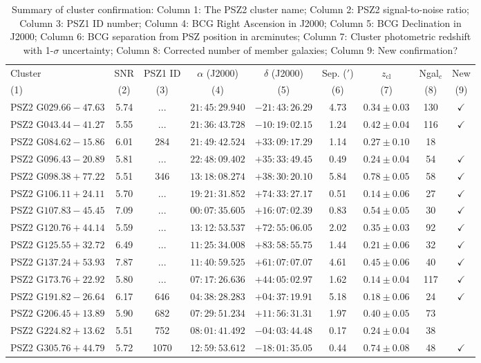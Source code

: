 \documentclass[apj, revtex4-1]{emulateapj}
\newcommand{\nd}{...}
\begin{document}
\begin{table*}
	\caption[Summary of Cluster Confirmation]{Summary of cluster confirmation: Column 1: The PSZ2 cluster name; Column 2: PSZ2 signal-to-noise ratio; Column 3: PSZ1 ID number; Column 4: BCG Right Ascension in J2000; Column 5: BCG Declination in J2000; Column 6: BCG separation from PSZ position in arcminutes; Column 7: Cluster photometric redshift with 1-$\sigma$ uncertainty; Column 8: Corrected number of member galaxies; Column 9: New confirmation? }
	\centering
	\begin{tabular}{lcccccccc}
	\hline
	Cluster & SNR & PSZ1 ID & $\alpha$ (J2000) & $\delta$ (J2000) & Sep. ($'$) & $z_\mathrm{cl}$ & Ngal$_c$ & New\\
	(1) & (2) & (3) & (4) & (5) & (6) & (7) & (8) & (9) \\
	\hline
	 PSZ2 G$029.66-47.63$ & 5.74 & \nd & $21:45:29.940$ & $-21:43:26.29$ & 4.73 & $0.34 \pm 0.03$ & 130 & $\checkmark$ \\
	 PSZ2 G$043.44-41.27$ & 5.55 & \nd & $21:36:43.728$ & $-10:19:02.15$ & 1.24 & $0.42 \pm 0.04$ & 116 & $\checkmark$ \\
	 PSZ2 G$084.62-15.86$ & 6.01 & 284 & $21:49:42.524$ & $+33:09:17.29$ & 1.14 & $0.27 \pm 0.10$ & 18 & \\
	 PSZ2 G$096.43-20.89$ & 5.81 & \nd & $22:48:09.402$ & $+35:33:49.45$ & 0.49 & $0.24 \pm 0.04$ & 54 & $\checkmark$ \\
	 PSZ2 G$098.38+77.22$ & 5.51 & 346 & $13:18:08.274$ & $+38:30:20.10$ & 5.84 & $0.78 \pm 0.05$ & 58 & $\checkmark$ \\
	 PSZ2 G$106.11+24.11$ & 5.70 & \nd & $19:21:31.852$ & $+74:33:27.17$ & 0.51 & $0.14 \pm 0.06$ & 27 & $\checkmark$ \\
	 PSZ2 G$107.83-45.45$ & 7.09 & \nd & $00:07:35.605$ & $+16:07:02.39$ & 0.83 & $0.54 \pm 0.05$ & 30 & $\checkmark$ \\
	 PSZ2 G$120.76+44.14$ & 5.59 & \nd & $13:12:53.537$ & $+72:55:06.05$ & 2.02 & $0.35 \pm 0.03$ & 92 & $\checkmark$ \\
	 PSZ2 G$125.55+32.72$ & 6.49 & \nd & $11:25:34.008$ & $+83:58:55.75$ & 1.44 & $0.21 \pm 0.06$ & 32 & $\checkmark$ \\
	 PSZ2 G$137.24+53.93$ & 7.87 & \nd & $11:40:59.525$ & $+61:07:07.07$ & 4.61 & $0.45 \pm 0.06$ & 40 & $\checkmark$ \\
	 PSZ2 G$173.76+22.92$ & 5.80 & \nd & $07:17:26.636$ & $+44:05:02.97$ & 1.62 & $0.14 \pm 0.04$ & 117 & $\checkmark$ \\
	 PSZ2 G$191.82-26.64$ & 6.17 & 646 & $04:38:28.283$ & $+04:37:19.91$ & 5.18 & $0.18 \pm 0.06$ & 24 & $\checkmark$ \\
	 PSZ2 G$206.45+13.89$ & 5.90 & 682 & $07:29:51.234$ & $+11:56:31.31$ & 1.97 & $0.40 \pm 0.05$ & 73 & \\
	 PSZ2 G$224.82+13.62$ & 5.51 & 752 & $08:01:41.492$ & $-04:03:44.48$ & 0.17 & $0.24 \pm 0.04$ & 38 & \\
	 PSZ2 G$305.76+44.79$ & 5.72 & 1070 & $12:59:53.612$ & $-18:01:35.05$ & 0.44 & $0.74 \pm 0.08$ & 48 & $\checkmark$ \\
	\hline
	\end{tabular}
\label{tbl:results}
\end{table*}
\end{document}
